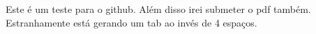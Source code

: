 \documentclass{article}
\begin{document}
	Este é um teste para o github.
	Além disso irei submeter o pdf também.
	Estranhamente está gerando um tab ao invés de 4 espaços.
\end{document}
